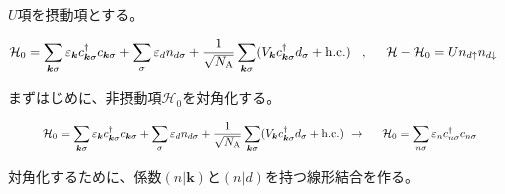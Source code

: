 \documentclass[a4j]{jarticle}
\begin{document}
$U$項を摂動項とする。

\begin{align}
	\mathcal{H}_{0}
	 & =
	\sum_{\bm{k}\sigma}
	\varepsilon_{\bm{k}}
	c^{\dagger}_{\bm{k} \sigma}
	c_{\bm{k} \sigma}
	+
	\sum_{\sigma}
	\varepsilon_{d}
	n_{d \sigma}
	+
	\frac{1}{\sqrt{N_{\rm A}}}
	\sum_{\bm{k}\sigma}
	(
	V_{\bm{k}}
	c_{\bm{k}\sigma}^{\dagger}
	d_{\sigma}
	+
	{\rm h.c.}
	)
	\hspace{3mm}
	,
	\hspace{5mm}
	\mathcal{H}
	-
	\mathcal{H}_{0}
	=
	U
	n_{d \uparrow}
	n_{d \downarrow}
\end{align}

まずはじめに、非摂動項$\mathcal{H}_{0}$を対角化する。

\begin{align}
	\hspace{10.2mm}
	\mathcal{H}_{0}
	=
	\sum_{\bm{k}\sigma}
	\varepsilon_{\bm{k}}
	c^{\dagger}_{\bm{k} \sigma}
	c_{\bm{k} \sigma}
	+
	\sum_{\sigma}
	\varepsilon_{d}
	n_{d \sigma}
	+
	\frac{1}{\sqrt{N_{\rm A}}}
	\sum_{\bm{k}\sigma}
	(
	V_{\bm{k}}
	c_{\bm{k}\sigma}^{\dagger}
	d_{\sigma}
	+
	{\rm h.c.}
	)
	\
	\to
	\hspace{5mm}
	\mathcal{H}_{0}
	=
	\sum_{n \sigma}
	\varepsilon_{n}
	c_{n \sigma}^{\dagger}
	c_{n \sigma}
	\hspace{10.2mm}
\end{align}

対角化するために、係数$( n | \bm{k} )$と$( n | d )$を持つ線形結合を作る。
\end{document}
